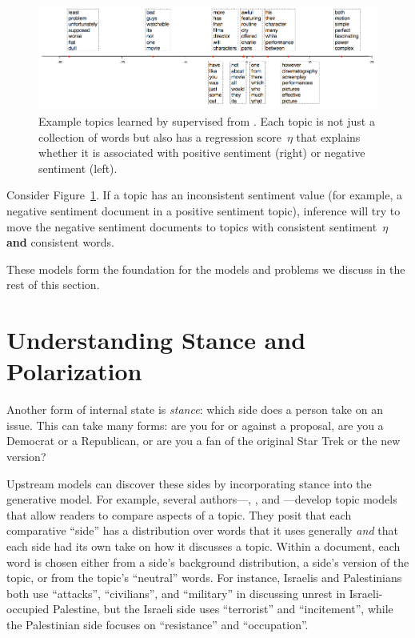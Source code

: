 \begin{figure}
  \begin{center}
    \includegraphics[width=1.0\linewidth]{figures/slda}
  \end{center}
  \caption{Example topics learned by supervised  from
    \citet{blei-07b}.  Each topic is not just a collection of words
    but also has a regression score~$\eta$ that explains whether it is
    associated with positive sentiment (right) or negative sentiment
    (left).}
  \label{fig:slda-topics}
\end{figure}

Consider Figure~\ref{fig:slda-topics}.  If a topic has an inconsistent
sentiment value (for example, a negative sentiment document in a
positive sentiment topic), inference will try to move the negative
sentiment documents to topics with consistent sentiment~$\eta$ {\bf
  and} consistent words.  

These models form the foundation for the models and problems we
discuss in the rest of this section.

\section{Understanding Stance and Polarization}

Another form of internal state is \emph{stance}: which side does a
person take on an issue.  This can take many forms: are you for or
against a proposal, are you a Democrat or a Republican, or are you a
fan of the original Star Trek or the new version?

Upstream models can discover these sides by incorporating stance into
the generative model.  For example, several authors---\citet{zhai-04},
\citet{lu-08}, and \citet{paul-10}---develop topic models that allow readers to compare
aspects of a topic.  They posit that each comparative
``side'' has a distribution over words that it uses generally
\emph{and} that each side had its own take on how it discusses a
topic.  Within a document, each word is chosen either from a side's
background distribution, a side's version of the topic, or from the
topic's ``neutral'' words.  For instance, Israelis and Palestinians
both use ``attacks'', ``civilians'', and ``military'' in discussing
unrest in Israeli-occupied Palestine, but the Israeli side uses
``terrorist'' and ``incitement'', while the Palestinian side focuses
on ``resistance'' and ``occupation''.

